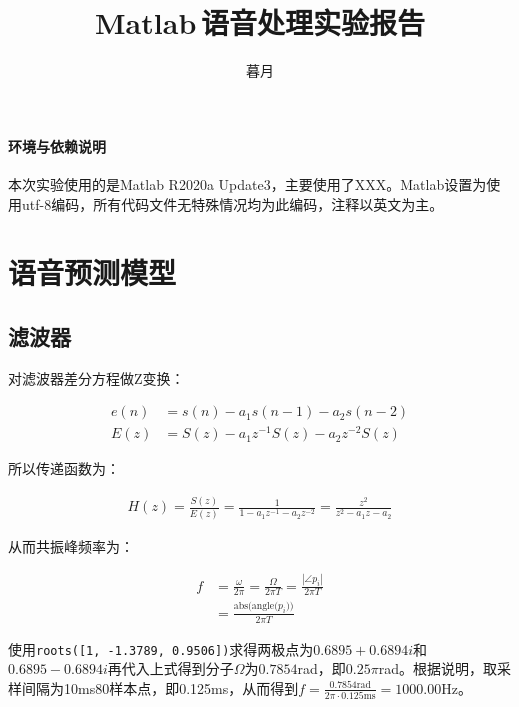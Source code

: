 \documentclass[10pt, a4paper]{article}
\begin{document}

\title{Matlab\,语音处理实验报告}
\author{暮月}

\maketitle

\tableofcontents

\paragraph{环境与依赖说明}本次实验使用的是Matlab R2020a Update3，主要使用了XXX。Matlab设置为使用utf-8编码，所有代码文件无特殊情况均为此编码，注释以英文为主。

\section{语音预测模型}

\subsection{滤波器}\label{sec:filter}

对滤波器差分方程做Z变换：

\begin{align*}
    e(n) & = s(n) - a_1 s(n - 1) - a_2 s(n - 2)       \\
    E(z) & = S(z) - a_1 z^{-1} S(z) - a_2 z^{-2} S(z)
\end{align*}

所以传递函数为：

\begin{align*}
    H(z) = \frac{S(z)}{E(z)} = \frac{1}{1 - a_1 z^{-1} - a_2 z^{-2}} = \frac{z^2}{z^2 - a_1 z - a_2}
\end{align*}

从而共振峰频率为：

\begin{align*}
    f & = \frac{\omega}{2\pi} = \frac{\Omega}{2\pi T} = \frac{|\angle{p_i}|}{2\pi T} \\
      & = \frac{\text{abs(angle($p_i$))}}{2\pi T}
\end{align*}

使用\texttt{roots([1, -1.3789, 0.9506])}求得两极点为$0.6895 + 0.6894i$和$0.6895 - 0.6894i$再代入上式得到分子$\Omega$为$0.7854$rad，即$0.25\pi$rad。根据说明，取采样间隔为10ms80样本点，即0.125ms，从而得到$f = \frac{0.7854\text{rad}}{2\pi \cdot 0.125\text{ms}} = 1000.00\text{Hz}$。
\end{document}
